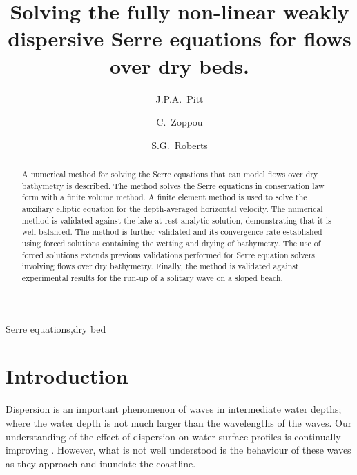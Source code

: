 \documentclass[times]{elsarticle}
\begin{document}
\title{Solving the fully non-linear weakly dispersive Serre equations for flows over dry beds.}

\author[ANU]{J.P.A.~Pitt}
\author[ANU]{C.~Zoppou}
\author[ANU]{S.G.~Roberts}

\address[ANU]{Mathematical Sciences Institute, Australian National University, Canberra, ACT 0200, Australia}
 
 
 \begin{abstract}
 	A numerical method for solving the Serre equations that can model flows over dry bathymetry is described. The method solves the Serre equations in conservation law form with a finite volume method. A finite element method is used to solve the auxiliary elliptic equation for the depth-averaged horizontal velocity. The numerical method is validated against the lake at rest analytic solution, demonstrating that it is well-balanced. The method is further validated and its convergence rate established using forced solutions containing the wetting and drying of bathymetry. The use of forced solutions extends previous validations performed for Serre equation solvers involving flows over dry bathymetry. Finally, the method is validated against experimental results for the run-up of a solitary wave on a sloped beach.

 \end{abstract}	
 
  \begin{keyword}
  	Serre equations\sep dry bed
  \end{keyword}
  
 \maketitle
\linenumbers
\section{Introduction} \label{intro} 

Dispersion is an important phenomenon of waves in intermediate water depths; where the water depth is not much larger than the wavelengths of the waves. Our understanding of the effect of dispersion on water surface profiles is continually improving \cite{Pitt-2018-61}. However, what is not well understood is the behaviour of these waves as they approach and inundate the coastline. 
\end{document}
